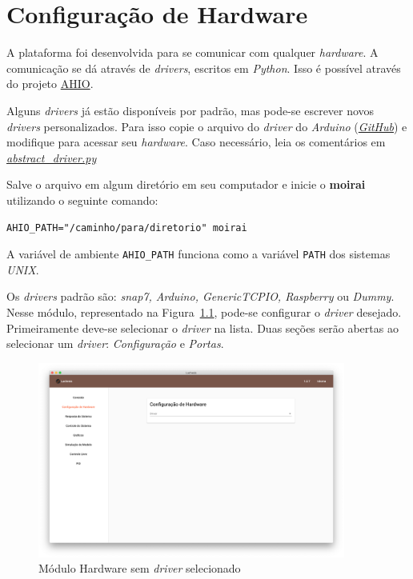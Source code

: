 
\chapter{Configuração de Hardware}%
\label{chapter:hardware-configuration}

A plataforma foi desenvolvida para se comunicar com qualquer \textit{hardware}.
A comunicação se dá através de \textit{drivers}, escritos em \textit{Python}.
Isso é possível através do projeto
\href{https://github.com/acristoffers/ahio}{AHIO}.

Alguns \textit{drivers} já estão disponíveis por padrão, mas pode-se escrever
novos \textit{drivers} personalizados. Para isso copie o arquivo do
\textit{driver} do \textit{Arduino}
(\href{https://github.com/acristoffers/ahio/blob/master/ahio/drivers/arduino.py}{\textit{GitHub}})
e modifique para acessar seu \textit{hardware}. Caso necessário, leia os
comentários em
\href{https://github.com/acristoffers/ahio/blob/master/ahio/abstract_driver.py}{\textit{abstract\_driver.py}}

Salve o arquivo em algum diretório em seu computador e inicie o \textbf{moirai}
utilizando o seguinte comando:

\texttt{AHIO_PATH="/caminho/para/diretorio" moirai}

A variável de ambiente \texttt{AHIO_PATH} funciona como a variável
\texttt{PATH} dos sistemas \textit{UNIX}.

Os \textit{drivers} padrão são: \textit{snap7, Arduino, GenericTCPIO, Raspberry}
ou \textit{Dummy}. Nesse módulo, representado na Figura~\ref{fig:hardware1},
pode-se configurar o \textit{driver} desejado. Primeiramente deve-se selecionar
o \textit{driver} na lista. Duas seções serão abertas ao selecionar um
\textit{driver}: \textit{Configuração} e \textit{Portas}.

\begin{figure}[ht!]
    \centering
    \includegraphics[width=0.9\textwidth]{imgs/hardware}
    \caption[Módulo Hardware sem driver selecionado]{Módulo Hardware sem \textit{driver} selecionado}%
    \label{fig:hardware1}
\end{figure}

